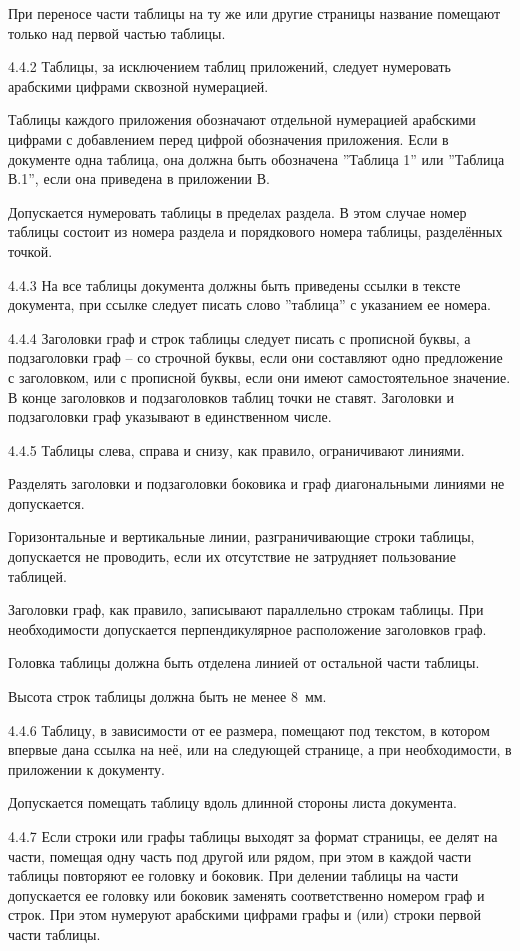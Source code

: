 При переносе части таблицы на ту же или другие страницы название помещают только над первой частью таблицы.

4.4.2 Таблицы, за исключением таблиц приложений, следует нумеровать арабскими цифрами сквозной нумерацией.

Таблицы каждого приложения обозначают отдельной нумерацией арабскими цифрами с добавлением перед цифрой обозначения приложения. Если в документе одна таблица, она должна быть обозначена ''Таблица 1'' или ''Таблица В.1'', если она приведена в приложении В.

Допускается нумеровать таблицы в пределах раздела. В этом случае номер таблицы состоит из номера раздела и порядкового номера таблицы, разделённых точкой.

4.4.3 На все таблицы документа должны быть приведены ссылки в тексте документа, при ссылке следует писать слово ''таблица'' с указанием ее номера.

4.4.4 Заголовки граф и строк таблицы следует писать с прописной буквы, а подзаголовки граф – со строчной буквы, если они составляют одно предложение с заголовком, или с прописной буквы, если они имеют самостоятельное значение. В конце заголовков и подзаголовков таблиц точки не ставят. Заголовки и подзаголовки граф указывают в единственном числе.

4.4.5 Таблицы слева, справа и снизу, как правило, ограничивают линиями.

Разделять заголовки и подзаголовки боковика и граф диагональными линиями не допускается.

Горизонтальные и вертикальные линии, разграничивающие строки таблицы, допускается не проводить, если их отсутствие не затрудняет пользование таблицей.

Заголовки граф, как правило, записывают параллельно строкам таблицы. При необходимости допускается перпендикулярное расположение заголовков граф.

Головка таблицы должна быть отделена линией от остальной части таблицы.

Высота строк таблицы должна быть не менее 8~мм.

4.4.6 Таблицу, в зависимости от ее размера, помещают под текстом, в котором впервые дана ссылка на неё, или на следующей странице, а при необходимости, в приложении к документу.

Допускается помещать таблицу вдоль длинной стороны листа документа.

4.4.7 Если строки или графы таблицы выходят за формат страницы, ее делят на части, помещая одну часть под другой или рядом, при этом в каждой части таблицы повторяют ее головку и боковик. При делении таблицы на части допускается ее головку или боковик заменять соответственно номером граф и строк. При этом нумеруют арабскими цифрами графы и (или) строки первой части таблицы.


